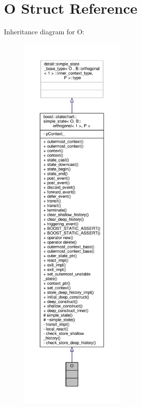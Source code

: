 \hypertarget{struct_o}{}\section{O Struct Reference}
\label{struct_o}


Inheritance diagram for O\+:
\nopagebreak
\begin{figure}[H]
\begin{center}
\leavevmode
\includegraphics[height=550pt]{struct_o__inherit__graph}
\end{center}
\end{figure}


